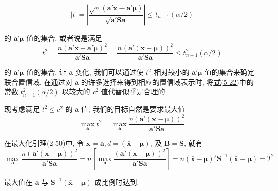 \[
|t|=\left|\frac{\sqrt{n}(\mathbf{a}'\bar{\mathbf{x}}-\mathbf{a}'\boldsymbol{\mu})}{\sqrt{\mathbf{a}'\mathbf{S}\mathbf{a}}}\right|\le t_{n-1}(\alpha/2)
\]

的 $\mathbf{a}'\boldsymbol{\mu}$ 值的集合, 或者说是满足
\label{eq:5-22}
\begin{equation}
t^{2}=\frac{n(\mathbf{a}'\bar{\mathbf{x}}-\mathbf{a}'\boldsymbol{\mu})^{2}}{\mathbf{a}'\mathbf{S}\mathbf{a}}=\frac{n(\mathbf{a}'(\bar{\mathbf{x}}-\boldsymbol{\mu}))^{2}}{\mathbf{a}'\mathbf{S}\mathbf{a}}\le t_{n-1}^{2}(\alpha/2) \tag{5-22}
\end{equation}

的 $\mathbf{a}'\boldsymbol{\mu}$ 值的集合. 让 $\mathbf{a}$ 变化, 我们可以通过使 $t^{2}$ 相对较小的 $\mathbf{a}'\boldsymbol{\mu}$ 值的集合来确定联合置信域. 在通过对 $\mathbf{a}$ 的许多选择来得到相应的置信域表示时, 将\hyperref[eq:5-22]{式(5-22)}中的常数 $t_{n-1}^{2}(\alpha/2)$ 以较大的 $c^{2}$ 值代替似乎是合理的.

现考虑满足 $t^{2}\le c^{2}$ 的 $\mathbf{a}$ 值, 我们的目标自然是要求最大值
\[
\max_{\mathbf{a}} t^{2}=\max_{\mathbf{a}}\frac{n(\mathbf{a}'(\bar{\mathbf{x}}-\boldsymbol{\mu}))^{2}}{\mathbf{a}'\mathbf{S}\mathbf{a}}
\]

在最大化引理(2-50)中, 令 $\mathbf{x}=\mathbf{a}, d=(\bar{\mathbf{x}}-\boldsymbol{\mu})$, 及 $\mathbf{B}=\mathbf{S}$, 就有
\label{eq:5-23}
\begin{equation}
\max_{\mathbf{a}}\frac{n(\mathbf{a}'(\bar{\mathbf{x}}-\boldsymbol{\mu}))^{2}}{\mathbf{a}'\mathbf{S}\mathbf{a}}=n\left[\max_{\mathbf{a}}\frac{(\mathbf{a}'(\bar{\mathbf{x}}-\boldsymbol{\mu}))^{2}}{\mathbf{a}'\mathbf{S}\mathbf{a}}\right]=n(\bar{\mathbf{x}}-\boldsymbol{\mu})'\mathbf{S}^{-1}(\bar{\mathbf{x}}-\boldsymbol{\mu})=T^{2} \tag{5-23}
\end{equation}

最大值在 $\mathbf{a}$ 与 $\mathbf{S}^{-1}(\bar{\mathbf{x}}-\boldsymbol{\mu})$ 成比例时达到.


